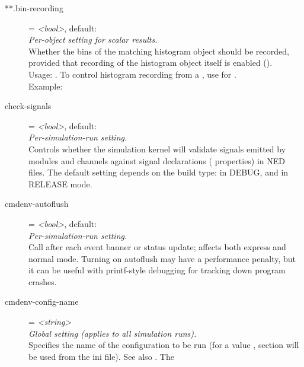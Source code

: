\begin{description}
\item[**.bin-recording] = \textit{<bool>}, default: \\
    \textit{Per-object setting for scalar results.}\\
    Whether the bins of the matching histogram object should be recorded,
    provided that recording of the histogram object itself is enabled
    ().\\
    Usage:
    .
    To control histogram recording from a , use
     for
    .\\
    Example:
\item[check-signals] = \textit{<bool>}, default: \\
    \textit{Per-simulation-run setting.}\\
    Controls whether the simulation kernel will validate signals emitted by
    modules and channels against signal declarations
    ( properties) in NED files. The default setting
    depends on the build type:  in DEBUG, and  in RELEASE
    mode.
\item[cmdenv-autoflush] = \textit{<bool>}, default: \\
    \textit{Per-simulation-run setting.}\\
    Call  after each event banner or status update; affects
    both express and normal mode. Turning on autoflush may have a performance
    penalty, but it can be useful with printf-style debugging for tracking down
    program crashes.
\item[cmdenv-config-name] = \textit{<string>}\\
    \textit{Global setting (applies to all simulation runs).}\\
    Specifies the name of the configuration to be run (for a value ,
    section  will be used from the ini file).
    See also
    . The

\end{description}
